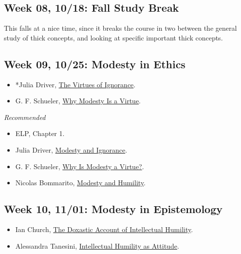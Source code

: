 \documentclass[
]{article}
\providecommand{\tightlist}{%
  \setlength{\itemsep}{0pt}\setlength{\parskip}{0pt}}
\begin{document}
\hypertarget{week-08-1018-fall-study-break}{%
\subsection{Week 08, 10/18: Fall Study
Break}\label{week-08-1018-fall-study-break}}

This falls at a nice time, since it breaks the course in two between the
general study of thick concepts, and looking at specific important thick
concepts.

\hypertarget{week-09-1025-modesty-in-ethics}{%
\subsection{Week 09, 10/25: Modesty in
Ethics}\label{week-09-1025-modesty-in-ethics}}

\begin{itemize}
\tightlist
\item
  *Julia Driver, \href{https://www.jstor.org/stable/2027146}{The Virtues
  of Ignorance}.
\item
  G. F. Schueler, \href{https://www.jstor.org/stable/2382326}{Why
  Modesty Is a Virtue}.
\end{itemize}

\emph{Recommended}

\begin{itemize}
\tightlist
\item
  ELP, Chapter 1.
\item
  Julia Driver,
  \href{https://www.jstor.org/stable/10.1086/233947}{Modesty and
  Ignorance}.
\item
  G. F. Schueler, \href{https://doi.org/10.1086/233948}{Why Is Modesty a
  Virtue?}.
\item
  Nicolas Bommarito,
  \href{https://plato.stanford.edu/entries/modesty-humility/}{Modesty
  and Humility}.
\end{itemize}

\hypertarget{week-10-1101-modesty-in-epistemology}{%
\subsection{Week 10, 11/01: Modesty in
Epistemology}\label{week-10-1101-modesty-in-epistemology}}

\begin{itemize}
\tightlist
\item
  Ian Church,
  \href{http://logos-and-episteme.acadiasi.ro/the-doxastic-account-of-intellectual-humility-pages-413-433/}{The
  Doxastic Account of Intellectual Humility}.
\item
  Alessandra Tanesini,
  \href{https://onlinelibrary.wiley.com/doi/abs/10.1111/phpr.12326}{Intellectual
  Humility as Attitude}.
\end{itemize}
\end{document}
